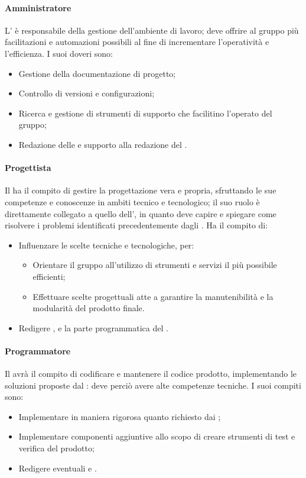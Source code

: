 \paragraph{Amministratore} \label{amministratore}
L'\adm{} è responsabile della gestione dell'ambiente di lavoro; deve offrire al gruppo più facilitazioni e automazioni possibili al fine di incrementare l'operatività e l'efficienza. I suoi doveri sono:
\begin{itemize}
\item Gestione della documentazione di progetto;
\item Controllo di versioni e configurazioni;
\item Ricerca e gestione di strumenti di supporto che facilitino l'operato del gruppo;
\item Redazione delle \NdP{} e supporto alla redazione del \PdP{}.
\end{itemize}

\paragraph{Progettista} \label{progettista}
Il \prog{} ha il compito di gestire la progettazione vera e propria, sfruttando le sue competenze e conoscenze in ambiti tecnico e tecnologico; il suo ruolo è direttamente collegato a quello dell'\ana, in quanto deve capire e spiegare come risolvere i problemi identificati precedentemente dagli \anas. Ha il compito di:
\begin{itemize}
\item Influenzare le scelte tecniche e tecnologiche, per:
\begin{itemize}
\item Orientare il gruppo all'utilizzo di strumenti e servizi il più possibile efficienti;
\item Effettuare scelte progettuali atte a garantire la manutenibilità e la modularità del prodotto finale.
\end{itemize} 
\item Redigere \ST{}, \DdP{} e la parte programmatica del \PdQ{}.
\end{itemize}

\paragraph{Programmatore} \label{programmatore}
Il \progr{} avrà il compito di codificare e mantenere il codice prodotto, implementando le soluzioni proposte dal \prog{}: deve perciò avere alte competenze tecniche. I suoi compiti sono:
\begin{itemize}
\item Implementare in maniera rigorosa quanto richiesto dai \progs{};
\item Implementare componenti aggiuntive allo scopo di creare strumenti di test e verifica del prodotto;
\item Redigere eventuali \MU{} e \MM{}.
\end{itemize}

